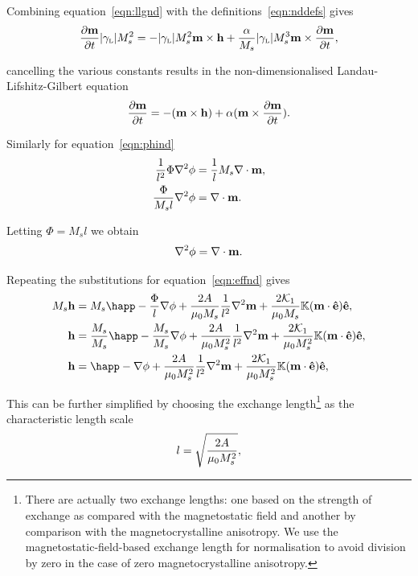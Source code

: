 Combining equation~\eqref{eqn:llgnd} with the definitions~\eqref{eqn:nddefs} gives
\begin{equation}
  \notag
  \frac{\partial \mathbf{m}}{\partial t} {\left|{\gamma_{\text{\tiny{L}}}} \right|} M_s^2 =
  - {\left|{\gamma_{\text{\tiny{L}}}} \right|} M_s^2 \mathbf{m} \times \mathbf{h} + \frac{\alpha}{M_s} {\left|{\gamma_{\text{\tiny{L}}}} \right|} M_s^3 \mathbf{m} \times \frac{\partial \mathbf{m}}{\partial t},
\end{equation}

cancelling the various constants results in the non-dimensionalised Landau-Lifshitz-Gilbert equation
\begin{equation}
  \label{eq:53}
  \frac{\partial \mathbf{m}}{\partial t} = - (\mathbf{m} \times \mathbf{h}) + \alpha (\mathbf{m} \times \frac{\partial \mathbf{m}}{\partial t}).
\end{equation}

Similarly for equation~\eqref{eqn:phind}
\begin{align*}
  \frac{1}{l^2} \Phi \nabla^{2} \phi &= \frac{1}{l} M_s \nabla \cdot \mathbf{m}, \\
  \frac{\Phi}{M_s l} \nabla^{2} \phi &= \nabla \cdot \mathbf{m}.
\end{align*}

Letting $\Phi = M_s l$ we obtain
\begin{equation}
  \label{eq:57}
  \nabla^2 \phi = \nabla \cdot \mathbf{m}.
\end{equation}

Repeating the substitutions for equation~\eqref{eqn:effnd} gives
\begin{align*}
  M_s \hv &= M_s \happ - \frac{\Phi}{l} \nabla \phi + \frac{2 \Exchc }{\mu_0 M_s} \frac{1}{l^2} \lap \mv + \frac{2\kone}{\mu_0 M_s}  \nK (\mv \cdot \ev) \ev, \\
  \hv &= \frac{M_s}{M_s} \happ - \frac{M_s}{M_s} \nabla \phi + \frac{2 \Exchc}{\mu_0 M_s^2} \frac{1}{l^2} \lap \mv + \frac{2\kone}{\mu_0 M_s^2} \nK (\mv \cdot \ev) \ev, \\
  \hv &= \happ - \nabla \phi + \frac{2 \Exchc}{\mu_0 M_s^2} \frac{1}{l^2} \lap \mv + \frac{2\kone}{\mu_0 M_s^2} \nK (\mv \cdot \ev) \ev, \\
\end{align*}

This can be further simplified by choosing the exchange length\footnote{There are actually two exchange lengths: one based on the strength of exchange as compared with the magnetostatic field and another by comparison with the magnetocrystalline anisotropy. We use the magnetostatic-field-based exchange length for normalisation to avoid division by zero in the case of zero magnetocrystalline anisotropy.} as the characteristic length scale
\begin{equation}
  \label{eqn:l-normalisation}
  l = \sqrt{ \frac{2 A}{\mu_0 M_s^2} },
\end{equation}

